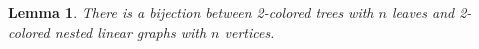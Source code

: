 \documentclass[twoside, 12pt]{amsart}
\newtheorem{lemma}[definition]{Lemma}
\theoremstyle{remark}
\begin{document}
\begin{lemma} 
\label{lemma:bijection}
There is a bijection between 2-colored trees with $n$ leaves and 2-colored nested linear graphs with $n$ vertices. 

\begin{figure}[h!]
\resizebox{0.8\linewidth}{!}{
















}
\end{figure}
\end{lemma}
\end{document}
